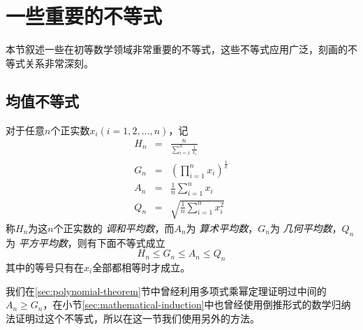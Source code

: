 
\section{一些重要的不等式}
\label{sec:some-important-inequation}

本节叙述一些在初等数学领域非常重要的不等式，这些不等式应用广泛，刻画的不等式关系非常深刻。

\subsection{均值不等式}

\begin{theorem}[均值不等式]
  对于任意$n$个正实数$x_{i}(i=1,2,\ldots,n)$，记
  \begin{eqnarray}
    \label{eq:definition-of-average}
    H_n &=& \frac{n}{\sum_{i=1}^n \frac{1}{x_i}} \\
    G_n &=& (\prod_{i=1}^nx_{i})^{\frac{1}{n}} \\
    A_n &=& \frac{1}{n}\sum_{i=1}^{n}x_i \\
    Q_n &=& \sqrt{\frac{1}{n}\sum_{i=1}^nx_i^2}
  \end{eqnarray}
  称$H_{n}$为这$n$个正实数的 \emph{调和平均数}，而$A_{n}$为 \emph{算术平均数}，$G_n$为 \emph{几何平均数}，$Q_{n}$为 \emph{平方平均数}，则有下面不等式成立
  \begin{equation}
    \label{eq:mean-inequation-general}
    H_{n} \leqslant G_{n} \leqslant A_{n} \leqslant Q_{n}
  \end{equation}
  其中的等号只有在$x_{i}$全部都相等时才成立。
\end{theorem}

我们在\ref{sec:polynomial-theorem}节中曾经利用多项式乘幂定理证明过中间的$A_n \geqslant G_n$，在小节\ref{sec:mathematical-induction}中也曾经使用倒推形式的数学归纳法证明过这个不等式，所以在这一节我们使用另外的方法。

